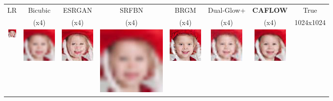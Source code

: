 \begin{figure}[h!]
    \begin{center}
    \setlength{\tabcolsep}{1pt} %
    \begin{tabular}{cccccccc}
        \scriptsize LR & \scriptsize Bicubic & \scriptsize ESRGAN & \scriptsize SRFBN & \scriptsize BRGM & \scriptsize Dual-Glow+ & \scriptsize \textbf{CAFLOW} & \scriptsize True \\
        & (x4) & (x4) & (x4) & (x4) & (x4) & (x4) & 1024x1024 \\
        \includegraphics[width=0.12\linewidth]{Chapter1/paper_graphs/super_resolution/LR.jpg} &
        \includegraphics[width=0.12\linewidth]{Chapter1/paper_graphs/super_resolution/BICUBIC.jpg} &
        \includegraphics[width=0.12\linewidth]{Chapter1/paper_graphs/super_resolution/ESRGAN.jpg} &
        \includegraphics[width=0.12\linewidth]{Chapter1/paper_graphs/super_resolution/SRFBN.jpg} &
        \includegraphics[width=0.12\linewidth]{Chapter1/paper_graphs/super_resolution/BRGM.jpg} &
        \includegraphics[width=0.12\linewidth]{Chapter1/paper_graphs/super_resolution/Dual-Glow.png} &
        \includegraphics[width=0.12\linewidth]{Chapter1/paper_graphs/super_resolution/CAFLOW.png} &

\end{tabular}
\end{center}
\end{figure}
